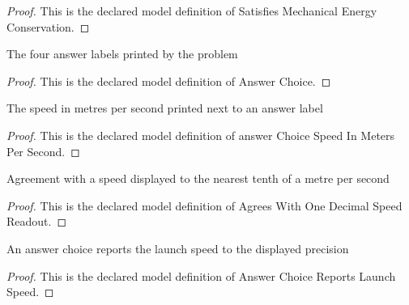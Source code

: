\begin{proof}
  This is the declared model definition of Satisfies Mechanical Energy Conservation.
\end{proof}
\begin{definition}
  \label{def:physics:phyx-mini-0694:phyxminiproblems-problemphyxmini0694-answerchoice}
  The four answer labels printed by the problem
\end{definition}
\begin{proof}
  This is the declared model definition of Answer Choice.
\end{proof}
\begin{definition}
  \label{def:physics:phyx-mini-0694:phyxminiproblems-problemphyxmini0694-answerchoicespeedinmeterspersecond}
  The speed in metres per second printed next to an answer label
\end{definition}
\begin{proof}
  This is the declared model definition of answer Choice Speed In Meters Per Second.
\end{proof}
\begin{definition}
  \label{def:physics:phyx-mini-0694:phyxminiproblems-problemphyxmini0694-agreeswithonedecimalspeedreadout}
  Agreement with a speed displayed to the nearest tenth of a metre per second
\end{definition}
\begin{proof}
  This is the declared model definition of Agrees With One Decimal Speed Readout.
\end{proof}
\begin{definition}
  \label{def:physics:phyx-mini-0694:phyxminiproblems-problemphyxmini0694-answerchoicereportslaunchspeed}
  An answer choice reports the launch speed to the displayed precision
\end{definition}
\begin{proof}
  This is the declared model definition of Answer Choice Reports Launch Speed.
\end{proof}
